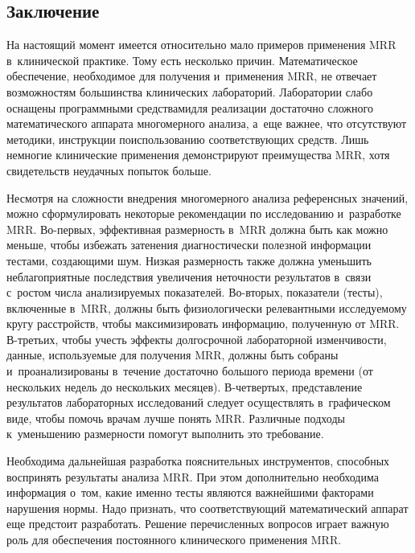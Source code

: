\begin{multicols}{2}
\vspace*{-6pt}

\section{Заключение}

\vspace*{-2pt}

     На настоящий момент имеется относительно мало примеров применения 
MRR в~клинической практике. Тому есть несколько причин. Математическое 
обеспечение, необходимое для получения и~применения MRR, не отвечает 
возможностям большинства клинических лабораторий. Лаборатории слабо 
оснащены программными средствами\linebreak для реализации достаточно сложного 
математического аппарата многомерного анализа, а~еще важнее, что 
отсутствуют методики, инструкции по\linebreak использованию соответствующих 
средств. Лишь немногие клинические применения демонстрируют 
преимущества MRR, хотя свидетельств неудачных попыток больше.
     
     Несмотря на сложности внедрения мно\-го\-мерно\-го анализа референсных 
значений, можно сформулировать некоторые рекомендации по иссле\-до\-ва\-нию 
и~разработке MRR. Во-пер\-вых, эффективная размерность в~MRR должна 
быть как можно меньше, чтобы избежать затенения диагностически полезной 
информации тестами, со\-зда\-ющи\-ми шум. Низкая размерность также должна 
уменьшить неблагоприятные последствия увеличения неточности результатов 
в~связи с~ростом числа анализируемых показателей. Во-вто\-рых, показатели 
(тес\-ты), включенные в~MRR, должны быть физиологически релевантными 
исследуемому кругу расстройств, чтобы максимизировать информацию, 
полученную от MRR. В-треть\-их, чтобы учесть эффекты долгосрочной 
лабораторной из\-мен\-чи\-вости, данные, используемые для получения MRR, 
долж\-ны быть собраны и~проанализированы в~течение достаточно большого 
периода времени (от нескольких недель до нескольких месяцев).  
В-чет\-вер\-тых, представление результатов лабораторных исследований 
следует осуществлять в~графическом виде, чтобы помочь врачам лучше понять 
MRR. Различные подходы к~уменьшению размерности помогут выполнить это 
требование.
     
     Необходима дальнейшая разработка пояснительных инструментов, 
способных воспринять результаты анализа MRR. При этом дополнительно 
необходима информация о~том, какие именно тес\-ты являются важнейшими 
факторами нарушения нормы. Надо признать, что соответствующий 
математический аппарат еще предстоит разработать. Решение перечисленных 
вопросов играет важную роль для обеспечения постоянного клинического 
применения MRR. 


\end{multicols}
